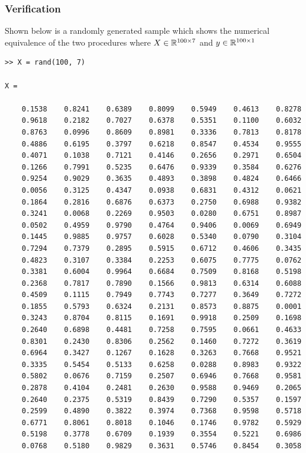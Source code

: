\documentclass[11pt, oneside]{article}   	%
\begin{document}
\newpage{}
\subsubsection{Verification}
Shown below is a randomly generated sample which shows the numerical equivalence of the two procedures where $X \in \Bbb R^{100 \times 7}$ and $y \in \Bbb R^{100 \times 1}$
\begin{verbatim}
>> X = rand(100, 7)

X =

    0.1538    0.8241    0.6389    0.8099    0.5949    0.4613    0.8278
    0.9618    0.2182    0.7027    0.6378    0.5351    0.1100    0.6032
    0.8763    0.0996    0.8609    0.8981    0.3336    0.7813    0.8178
    0.4886    0.6195    0.3797    0.6218    0.8547    0.4534    0.9555
    0.4071    0.1038    0.7121    0.4146    0.2656    0.2971    0.6504
    0.1266    0.7991    0.5235    0.6476    0.9339    0.3584    0.6276
    0.9254    0.9029    0.3635    0.4893    0.3898    0.4824    0.6466
    0.0056    0.3125    0.4347    0.0938    0.6831    0.4312    0.0621
    0.1864    0.2816    0.6876    0.6373    0.2750    0.6988    0.9382
    0.3241    0.0068    0.2269    0.9503    0.0280    0.6751    0.8987
    0.0502    0.4959    0.9790    0.4764    0.9406    0.0069    0.6949
    0.1445    0.9885    0.9757    0.6028    0.5340    0.0790    0.3104
    0.7294    0.7379    0.2895    0.5915    0.6712    0.4606    0.3435
    0.4823    0.3107    0.3384    0.2253    0.6075    0.7775    0.0762
    0.3381    0.6004    0.9964    0.6684    0.7509    0.8168    0.5198
    0.2368    0.7817    0.7890    0.1566    0.9813    0.6314    0.6088
    0.4509    0.1115    0.7949    0.7743    0.7277    0.3649    0.7272
    0.1855    0.5793    0.6324    0.2131    0.8573    0.8875    0.0001
    0.3243    0.8704    0.8115    0.1691    0.9918    0.2509    0.1698
    0.2640    0.6898    0.4481    0.7258    0.7595    0.0661    0.4633
    0.8301    0.2430    0.8306    0.2562    0.1460    0.7272    0.3619
    0.6964    0.3427    0.1267    0.1628    0.3263    0.7668    0.9521
    0.3335    0.5454    0.5133    0.6258    0.0288    0.8983    0.9322
    0.5802    0.0676    0.7159    0.2507    0.6946    0.7668    0.9581
    0.2878    0.4104    0.2481    0.2630    0.9588    0.9469    0.2065
    0.2640    0.2375    0.5319    0.8439    0.7290    0.5357    0.1597
    0.2599    0.4890    0.3822    0.3974    0.7368    0.9598    0.5718
    0.6771    0.8061    0.8018    0.1046    0.1746    0.9782    0.5929
    0.5198    0.3778    0.6709    0.1939    0.3554    0.5221    0.6986
    0.0768    0.5180    0.9829    0.3631    0.5746    0.8454    0.3058

\end{verbatim}
\end{document}
